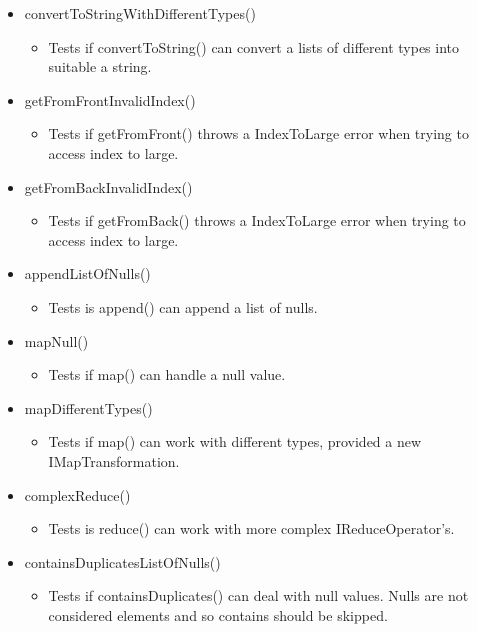 \documentclass{article}
\begin{document}
\begin{itemize}
\item convertToStringWithDifferentTypes()
\begin{itemize}
\item Tests if convertToString() can convert a lists of different types into suitable a string.
\end{itemize}

\item getFromFrontInvalidIndex()
\begin{itemize}
\item Tests if getFromFront() throws a IndexToLarge error when trying to access index to large.
\end{itemize}

\item getFromBackInvalidIndex()
\begin{itemize}
\item Tests if getFromBack() throws a IndexToLarge error when trying to access index to large.
\end{itemize}

\item appendListOfNulls()
\begin{itemize}
\item Tests is append() can append a list of nulls.
\end{itemize}

\item mapNull()
\begin{itemize}
\item Tests if map() can handle a null value.
\end{itemize}

\item mapDifferentTypes()
\begin{itemize}
\item Tests if map() can work with different types, provided a new IMapTransformation.
\end{itemize}

\item complexReduce()
\begin{itemize}
\item Tests is reduce() can work with more complex IReduceOperator's.
\end{itemize}

\item containsDuplicatesListOfNulls()
\begin{itemize}
\item Tests if containsDuplicates() can deal with null values. Nulls are not considered elements and so contains should be skipped.
\end{itemize}

\end{itemize}
\end{document}
